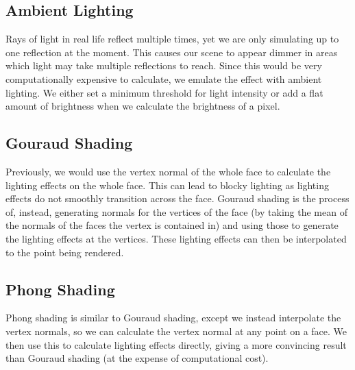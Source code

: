 \newpage

\subsection{Ambient Lighting}

Rays of light in real life reflect multiple times, yet we are only simulating up
to one reflection at the moment. This causes our scene to appear dimmer in
areas which light may take multiple reflections to reach. Since this would
be very computationally expensive to calculate, we emulate the effect with 
ambient lighting. We either set a minimum threshold for light intensity or
add a flat amount of brightness when we calculate the brightness of a pixel.

\subsection{Gouraud Shading}

Previously, we would use the vertex normal of the whole face to calculate the 
lighting effects on the whole face. This can lead to blocky lighting
as lighting effects do not smoothly transition across the face.
Gouraud shading is the process of, instead, generating normals for the vertices
of the face (by taking the mean of the normals of the faces the vertex is
contained in) and using those to generate the lighting effects at the vertices.
These lighting effects can then be interpolated to the point being rendered. 

\subsection{Phong Shading}

Phong shading is similar to Gouraud shading, except we instead interpolate the
vertex normals, so we can calculate the vertex normal at any point on a face.
We then use this to calculate lighting effects directly, giving a more
convincing result than Gouraud shading (at the expense of computational cost).
